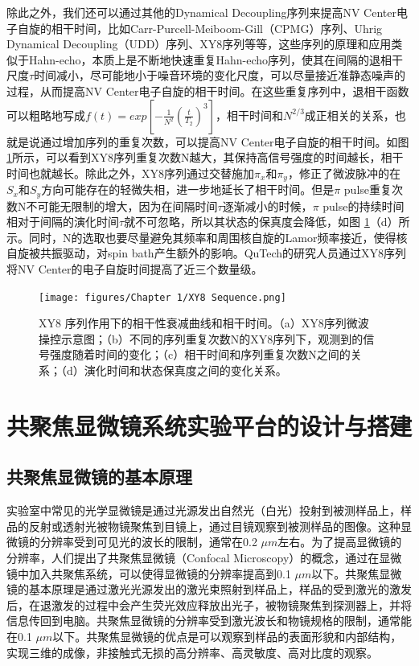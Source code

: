 \documentclass[type = bachelor]{whu-thesis}
\begin{document}
除此之外，我们还可以通过其他的Dynamical Decoupling序列来提高NV Center电子自旋的相干时间，比如Carr-Purcell-Meiboom-Gill（CPMG）序列、Uhrig Dynamical Decoupling（UDD）序列、XY8序列等等，这些序列的原理和应用类似于Hahn-echo，本质上是不断地快速重复Hahn-echo序列，使其在间隔的退相干尺度$\tau$时间减小，尽可能地小于噪音环境的变化尺度，可以尽量接近准静态噪声的过程，从而提高NV Center电子自旋的相干时间。在这些重复序列中，退相干函数可以粗略地写成$f(t)=exp[-\frac{1}{N^2}(\frac{t}{T_2})^3]$，相干时间和$N^{2/3}$成正相关的关系，也就是说通过增加序列的重复次数，可以提高NV Center电子自旋的相干时间。如图 \ref{fig: XY8 Sequence}所示，可以看到XY8序列重复次数N越大，其保持高信号强度的时间越长，相干时间也就越长。除此之外，XY8序列通过交替施加$\pi_x$和$\pi_y$，修正了微波脉冲的在$S_x$和$S_y$方向可能存在的轻微失相，进一步地延长了相干时间。但是$\pi$ pulse重复次数N不可能无限制的增大，因为在间隔时间$\tau$逐渐减小的时候，$\pi$ pulse的持续时间相对于间隔的演化时间$\tau$就不可忽略，所以其状态的保真度会降低，如图 \ref{fig: XY8 Sequence}（d）所示。同时，N的选取也要尽量避免其频率和周围核自旋的Lamor频率接近，使得核自旋被共振驱动，对spin bath产生额外的影响。QuTech的研究人员通过XY8序列将NV Center的电子自旋时间提高了近三个数量级\cite{abobeih2018one}。
\begin{figure}
  \centering
  \texttt{[image: figures/Chapter 1/XY8 Sequence.png]}
  \caption[XY8 序列作用下的相干性衰减曲线和相干时间]{XY8 序列作用下的相干性衰减曲线和相干时间。（a）XY8序列微波操控示意图；（b）不同的序列重复次数N的XY8序列下，观测到的信号强度随着时间的变化；（c）相干时间和序列重复次数N之间的关系；（d）演化时间和状态保真度之间的变化关系。\cite{abobeih2018one}}
  \label{fig: XY8 Sequence}
\end{figure}

\section{共聚焦显微镜系统实验平台的设计与搭建}
\subsection{共聚焦显微镜的基本原理}
实验室中常见的光学显微镜是通过光源发出自然光（白光）投射到被测样品上，样品的反射或透射光被物镜聚焦到目镜上，通过目镜观察到被测样品的图像。这种显微镜的分辨率受到可见光的波长的限制，通常在0.2 $\mu m$左右。为了提高显微镜的分辨率，人们提出了共聚焦显微镜（Confocal Microscopy）的概念，通过在显微镜中加入共聚焦系统，可以使得显微镜的分辨率提高到0.1 $\mu m$以下。共聚焦显微镜的基本原理是通过激光光源发出的激光束照射到样品上，样品的受到激光的激发后，在退激发的过程中会产生荧光效应释放出光子，被物镜聚焦到探测器上，并将信息传回到电脑。共聚焦显微镜的分辨率受到激光波长和物镜规格的限制，通常能在0.1 $\mu m$以下。共聚焦显微镜的优点是可以观察到样品的表面形貌和内部结构，实现三维的成像，非接触式无损的高分辨率、高灵敏度、高对比度的观察。
\end{document}
